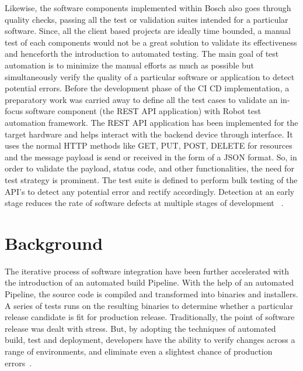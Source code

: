 Likewise, the software components implemented within Bosch also goes through quality checks, passing all the test or validation suites intended for a particular software. Since, all the client based projects are ideally time bounded, a manual test of each components would not be a great solution to validate its effectiveness and henceforth the introduction to automated testing. The main goal of test automation is to minimize the manual efforts as much as possible but simultaneously verify the quality of a particular software or application to detect potential errors. Before the development phase of the \ac{CI} \ac{CD} implementation, a preparatory work was carried away to define all the test cases to validate an in-focus software component (the \ac{REST} \ac{API} application) with Robot test automation framework. The \ac{REST} \ac{API} application has been implemented for the target hardware and helps interact with the backend device through interface. It uses the normal HTTP methods like GET, PUT, POST, DELETE for resources and the message payload is send or received in the form of a \ac{JSON} format. So, in order to validate the payload, status code, and other functionalities, the need for test strategy is prominent. The test suite is defined to perform bulk testing of the \ac{API}'s to detect any potential error and rectify accordingly. Detection at an early stage reduces the rate of software defects at multiple stages of development ~\parencite{asha2015api}.

\section{Background}\label{section:CICDpipeline}

The iterative process of software integration have been further accelerated with the introduction of an automated build Pipeline. With the help of an automated Pipeline, the source code is compiled and transformed into binaries and installers. A series of tests runs on the resulting binaries to determine whether a particular release candidate is fit for production release. Traditionally, the point of software release was dealt with stress. But, by adopting the techniques of automated build, test and deployment, developers have the ability to verify changes across a range of environments, and eliminate even a slightest chance of production errors~\parencite{humble2010continuous}.


